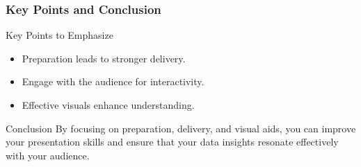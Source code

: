 \documentclass[aspectratio=169]{beamer}
\begin{document}
\begin{frame}[fragile]
    \frametitle{Key Points and Conclusion}
    \begin{block}{Key Points to Emphasize}
        \begin{itemize}
            \item Preparation leads to stronger delivery.
            \item Engage with the audience for interactivity.
            \item Effective visuals enhance understanding.
        \end{itemize}
    \end{block}
    
    \begin{block}{Conclusion}
        By focusing on preparation, delivery, and visual aids, you can improve your presentation skills and ensure that your data insights resonate effectively with your audience.
    \end{block}
\end{frame}
\end{document}

